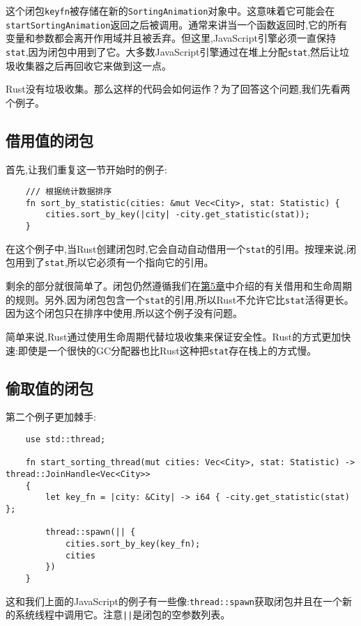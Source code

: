 这个闭包\texttt{keyfn}被存储在新的\texttt{SortingAnimation}对象中。这意味着它可能会在\texttt{startSortingAnimation}返回之后被调用。通常来讲当一个函数返回时,它的所有变量和参数都会离开作用域并且被丢弃。但这里,JavaScript引擎必须一直保持\texttt{stat},因为闭包中用到了它。大多数JavaScript引擎通过在堆上分配\texttt{stat},然后让垃圾收集器之后再回收它来做到这一点。

Rust没有垃圾收集。那么这样的代码会如何运作？为了回答这个问题,我们先看两个例子。

\subsection{借用值的闭包}
首先,让我们重复这一节开始时的例子:
\begin{verbatim}
    /// 根据统计数据排序
    fn sort_by_statistic(cities: &mut Vec<City>, stat: Statistic) {
        cities.sort_by_key(|city| -city.get_statistic(stat));
    }
\end{verbatim}

在这个例子中,当Rust创建闭包时,它会自动自动借用一个\texttt{stat}的引用。按理来说,闭包用到了\texttt{stat},所以它必须有一个指向它的引用。

剩余的部分就很简单了。闭包仍然遵循我们在\hyperref[ch05]{第5章}中介绍的有关借用和生命周期的规则。另外,因为闭包包含一个\texttt{stat}的引用,所以Rust不允许它比\texttt{stat}活得更长。因为这个闭包只在排序中使用,所以这个例子没有问题。

简单来说,Rust通过使用生命周期代替垃圾收集来保证安全性。Rust的方式更加快速:即使是一个很快的GC分配器也比Rust这种把\texttt{stat}存在栈上的方式慢。

\subsection{偷取值的闭包}\label{StealClosure}
第二个例子更加棘手:
\begin{verbatim}
    use std::thread;

    fn start_sorting_thread(mut cities: Vec<City>, stat: Statistic) -> thread::JoinHandle<Vec<City>>
    {
        let key_fn = |city: &City| -> i64 { -city.get_statistic(stat) };

        thread::spawn(|| {
            cities.sort_by_key(key_fn);
            cities
        })
    }
\end{verbatim}

这和我们上面的JavaScript的例子有一些像:\texttt{thread::spawn}获取闭包并且在一个新的系统线程中调用它。注意\texttt{||}是闭包的空参数列表。

